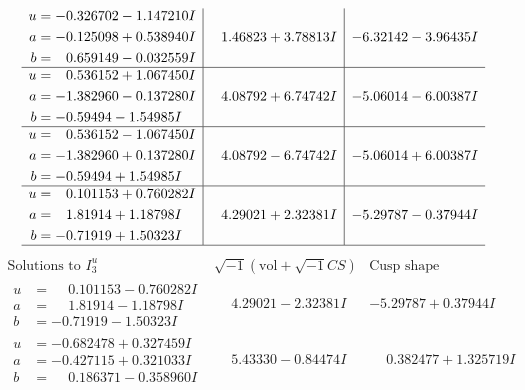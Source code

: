 \documentclass[1p]{elsarticle_modified}
\theoremstyle{definition}
\newcommand{\I}{\sqrt{-1}}
\begin{document}
$$\begin{array}{c|c|c}
\begin{aligned}
u &= -0.326702 - 1.147210 I \\
a &= -0.125098 + 0.538940 I \\
b &= \phantom{-}0.659149 - 0.032559 I\end{aligned}
 & \phantom{-}1.46823 + 3.78813 I & -6.32142 - 3.96435 I \\ \hline\begin{aligned}
u &= \phantom{-}0.536152 + 1.067450 I \\
a &= -1.382960 - 0.137280 I \\
b &= -0.59494 - 1.54985 I\end{aligned}
 & \phantom{-}4.08792 + 6.74742 I & -5.06014 - 6.00387 I \\ \hline\begin{aligned}
u &= \phantom{-}0.536152 - 1.067450 I \\
a &= -1.382960 + 0.137280 I \\
b &= -0.59494 + 1.54985 I\end{aligned}
 & \phantom{-}4.08792 - 6.74742 I & -5.06014 + 6.00387 I \\ \hline\begin{aligned}
u &= \phantom{-}0.101153 + 0.760282 I \\
a &= \phantom{-}1.81914 + 1.18798 I \\
b &= -0.71919 + 1.50323 I\end{aligned}
 & \phantom{-}4.29021 + 2.32381 I & -5.29787 - 0.37944 I\\
 \hline 
 \end{array}$$\newpage$$\begin{array}{c|c|c}  
\text{Solutions to }I^u_{3}& \I (\text{vol} + \sqrt{-1}CS) & \text{Cusp shape}\\
 \hline 
\begin{aligned}
u &= \phantom{-}0.101153 - 0.760282 I \\
a &= \phantom{-}1.81914 - 1.18798 I \\
b &= -0.71919 - 1.50323 I\end{aligned}
 & \phantom{-}4.29021 - 2.32381 I & -5.29787 + 0.37944 I \\ \hline\begin{aligned}
u &= -0.682478 + 0.327459 I \\
a &= -0.427115 + 0.321033 I \\
b &= \phantom{-}0.186371 - 0.358960 I\end{aligned}
 & \phantom{-}5.43330 - 0.84474 I & \phantom{-}0.382477 + 1.325719 I \\ \hline\begin{aligned}

\end{aligned}
\end{array}$$
\end{document}
